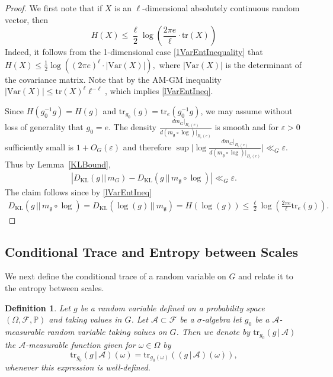 \documentclass[10pt, english,oneside,reqno]{amsart}
\theoremstyle{plain}
\newtheorem{definition}[theorem]{Definition}
\theoremstyle{remark}
\numberwithin{equation}{section}
\numberwithin{figure}{section}
\newcommand{\eps}{\varepsilon}
\newcommand{\tr}{\mathrm{tr}}
\newcommand{\Haarof}[1]{m_{#1}}
\begin{document}
\begin{proof}
    We first note that if $X$ is an $\ell$-dimensional absolutely continuous random vector, then 
    \begin{equation}\label{lVarEntIneq}
        H(X) \leq \frac{\ell}{2}\log\left(\frac{2\pi e}{\ell}\cdot \mathrm{tr}(X) \right)
    \end{equation}    Indeed, it follows from the 1-dimensional case \eqref{1VarEntInequality} that $H(X) \leq \frac{1}{2}\log((2\pi e)^{\ell} \cdot |\mathrm{Var}(X)|),$ where $|\mathrm{Var}(X)|$ is the determinant of the covariance matrix. Note that by the AM-GM inequality $|\mathrm{Var}(X)| \leq \tr(X)^{\ell}\ell^{-\ell}$, which implies \eqref{lVarEntIneq}. 

    Since $H(g_0^{-1}g) = H(g)$ and $\tr_{g_0}(g) = \tr_e(g_0^{-1}g)$, we may assume without loss of generality that $g_0 = e$. The density $\frac{d\Haarof{G}|_{B_{\eps}(e)}}{d(\Haarof{\mathfrak{g}} \circ \log)|_{B_{\eps}(e)}}$ is smooth and for $\varepsilon > 0$ sufficiently small is $1 + O_G(\eps)$ and therefore $\sup \big|\log \frac{d\Haarof{G}|_{B_{\eps}(e)}}{d(\Haarof{\mathfrak{g}} \circ \log)|_{B_{\eps}(e)}}\big|  \ll_G \eps.$ Thus by Lemma~\ref{KLBound}, 
    \begin{align*}
        |D_{\mathrm{KL}}(g\,||\, \Haarof{G}) - D_{\mathrm{KL}}(g\,||\, \Haarof{\mathfrak{g}} \circ \log)| \ll_G \eps.
    \end{align*}
    The claim follows since by \eqref{lVarEntIneq} 
    \begin{align*}
        D_{\mathrm{KL}}(g\,||\, \Haarof{\mathfrak{g}} \circ \log) = D_{\mathrm{KL}}(\log(g) \,||\, m_{\mathfrak{g}}) = H(\log(g)) \leq \frac{\ell}{2} \log\left(  \frac{2\pi e}{\ell} \tr_{e}(g) \right).
    \end{align*}
\end{proof}

\subsection{Conditional Trace and Entropy between Scales}  \label{Entropy:Conditional}



We next define the conditional trace of a random variable on $G$ and relate it to the entropy between scales. 

\begin{definition}
    Let $g$ be a random variable defined on a probability space $(\Omega, \mathscr{F}, \mathbb{P})$ and taking values in $G$. Let $\mathscr{A} \subset \mathscr{F}$ be a $\sigma$-algebra let $g_0$ be a $\mathscr{A}$-measurable random variable taking values on $G$. Then we denote by $\tr_{g_0}(g\,|\, \mathscr{A})$ the $\mathscr{A}$-measurable function given for $\omega \in \Omega$ by $$\tr_{g_0}(g\,|\, \mathscr{A})(\omega) = \tr_{g_0(\omega)}((g\,|\, \mathscr{A})(\omega)),$$ whenever this expression is well-defined.
\end{definition}
\end{document}
